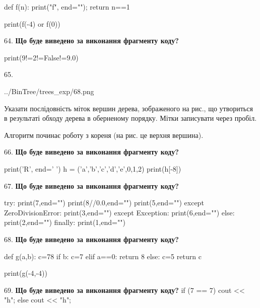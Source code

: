 \documentclass[11pt]{article}
\begin{document}
def f(n):
    print("f", end="");
    return n==1

print(f(-4) or f(0))
\par\vspace{5mm}

64. \textbf{Що буде виведено за виконання фрагменту коду?}

print(9!=2!=False!=9.0)
\par\vspace{5mm}

65. 

\begin{center}
	{../BinTree/trees_exp/68.png}
\end{center}
Указати послідовність міток вершин дерева, зображеного на рис., що утвориться в результаті обходу дерева в оберненому порядку. Мітки записувати через пробіл.\par Алгоритм починає роботу з кореня (на рис. це верхня вершина).
\par\vspace{5mm}

66. \textbf{Що буде виведено за виконання фрагменту коду?}

print('R', end=' ')
h = ('a','b','c','d','e',0,1,2)
print(h[-8])

\par\vspace{5mm}

67. \textbf{Що буде виведено за виконання фрагменту коду?}

try:
    print(7,end="")
    print(8//0.0,end="")
    print(5,end="")
except ZeroDivisionError: print(3,end="")
except Exception: print(6,end="")
else: print(2,end="")
finally: print(1,end="")
\par\vspace{5mm}

68. \textbf{Що буде виведено за виконання фрагменту коду?}

def g(a,b):
    c=78
    if b:
        c=7
    elif a==0:
         return 8
    else: 
        c=5
    return c

print(g(-4,-4))\par\vspace{5mm}

69. \textbf{Що буде виведено за виконання фрагменту коду?}
if (7 == 7)
    cout << "h";
else
    cout << "h";
\end{document}
